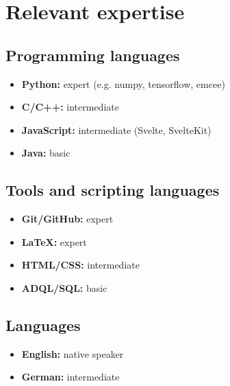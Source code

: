 \documentclass[12pt, letterpaper]{hunt-cv}
\begin{document}
\section*{Relevant expertise}

\subsection*{Programming languages}

\begin{itemize}
    \item \textbf{Python:} expert (e.g. numpy, tensorflow, emcee)
    \item \textbf{C/C++:} intermediate
    \item \textbf{JavaScript:} intermediate (Svelte, SvelteKit)
    \item \textbf{Java:} basic
\end{itemize}

\subsection*{Tools and scripting languages}

\begin{itemize}
    \item \textbf{Git/GitHub:} expert
    \item \textbf{LaTeX:} expert
    \item \textbf{HTML/CSS:} intermediate
    \item \textbf{ADQL/SQL:} basic
\end{itemize}

\subsection*{Languages}

\begin{itemize}
    \item \textbf{English:} native speaker
    \item \textbf{German:} intermediate
\end{itemize}
\end{document}
